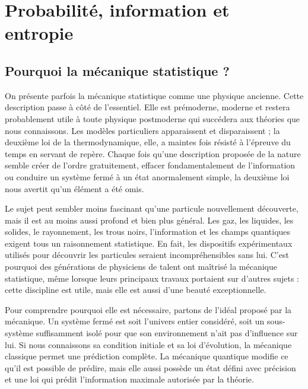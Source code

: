 \chapter{Probabilité, information et entropie}


\section{Pourquoi la mécanique statistique ?}

On présente parfois la mécanique statistique comme une physique ancienne. Cette description passe à côté de l’essentiel. Elle est prémoderne, moderne et restera probablement utile à toute physique postmoderne qui succédera aux théories que nous connaissons. Les modèles particuliers apparaissent et disparaissent ; la deuxième loi de la thermodynamique, elle, a maintes fois résisté à l’épreuve du temps en servant de repère. Chaque fois qu’une description proposée de la nature semble créer de l’ordre gratuitement, effacer fondamentalement de l’information ou conduire un système fermé à un état anormalement simple, la deuxième loi nous avertit qu’un élément a été omis.

Le sujet peut sembler moins fascinant qu’une particule nouvellement découverte, mais il est au moins aussi profond et bien plus général. Les gaz, les liquides, les solides, le rayonnement, les trous noirs, l’information et les champs quantiques exigent tous un raisonnement statistique. En fait, les dispositifs expérimentaux utilisés pour découvrir les particules seraient incompréhensibles sans lui. C’est pourquoi des générations de physiciens de talent ont maîtrisé la mécanique statistique, même lorsque leurs principaux travaux portaient sur d’autres sujets : cette discipline est utile, mais elle est aussi d’une beauté exceptionnelle.

Pour comprendre pourquoi elle est nécessaire, partons de l’idéal proposé par la mécanique. Un système fermé est soit l’univers entier considéré, soit un sous-système suffisamment isolé pour que son environnement n’ait pas d’influence sur lui. Si nous connaissons sa condition initiale et sa loi d’évolution, la mécanique classique permet une prédiction complète. La mécanique quantique modifie ce qu’il est possible de prédire, mais elle aussi possède un état défini avec précision et une loi qui prédit l’information maximale autorisée par la théorie.

